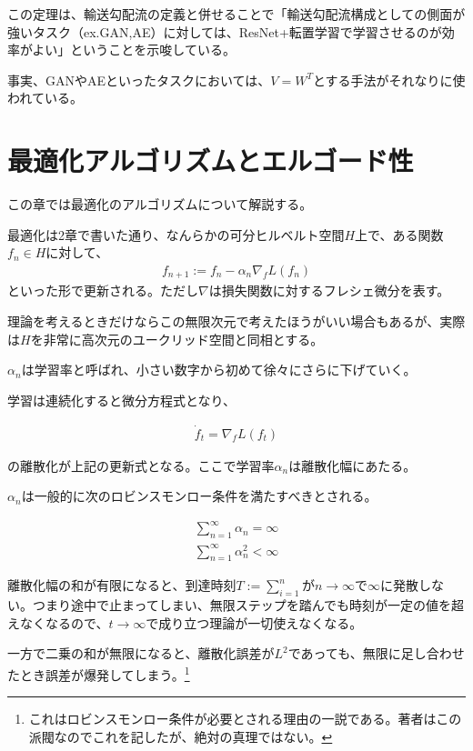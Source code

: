 \documentclass{jsarticle}
\begin{document}
この定理は、輸送勾配流の定義と併せることで「輸送勾配流構成としての側面が強いタスク（ex.GAN,AE）に対しては、ResNet+転置学習で学習させるのが効率がよい」ということを示唆している。

事実、GANやAEといったタスクにおいては、$V=W^T$とする手法がそれなりに使われている。




\newpage
\section{最適化アルゴリズムとエルゴード性}

この章では最適化のアルゴリズムについて解説する。

最適化は2章で書いた通り、なんらかの可分ヒルベルト空間$H$上で、ある関数$f_n\in H$に対して、
\begin{align}
f_{n+1}:=f_n-\alpha_n \nabla_f L(f_n)
\end{align}
といった形で更新される。ただし$\nabla$は損失関数に対するフレシェ微分を表す。

理論を考えるときだけならこの無限次元で考えたほうがいい場合もあるが、実際は$H$を非常に高次元のユークリッド空間と同相とする。

$\alpha_n$は学習率と呼ばれ、小さい数字から初めて徐々にさらに下げていく。

学習は連続化すると微分方程式となり、

\begin{align}
\dot{f}_t=\nabla_f L(f_t)
\end{align}

の離散化が上記の更新式となる。ここで学習率$\alpha_n$は離散化幅にあたる。

$\alpha_n$は一般的に次のロビンスモンロー条件を満たすべきとされる。

\begin{align}
\sum^\infty_{n=1} \alpha_n =\infty\nonumber\\
\sum^\infty_{n=1} \alpha_n^2<\infty
\end{align}

離散化幅の和が有限になると、到達時刻$T:=\sum^n_{i=1}$が$n\to\infty$で$\infty$に発散しない。つまり途中で止まってしまい、無限ステップを踏んでも時刻が一定の値を超えなくなるので、$t\to\infty$で成り立つ理論が一切使えなくなる。

一方で二乗の和が無限になると、離散化誤差が$L^2$であっても、無限に足し合わせたとき誤差が爆発してしまう。\footnote{これはロビンスモンロー条件が必要とされる理由の一説である。著者はこの派閥なのでこれを記したが、絶対の真理ではない。}
\end{document}
